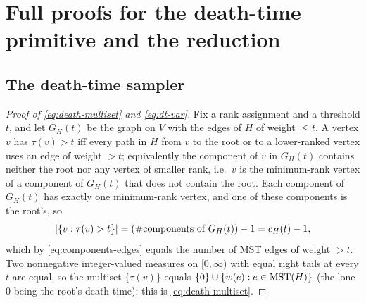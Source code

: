 \section{Full proofs for the death-time primitive and the reduction}\label{sec:app-assembly}

\subsection{The death-time sampler}\label{sec:app-dt}

\begin{proof}[Proof of \eqref{eq:death-multiset} and \eqref{eq:dt-var}]
Fix a rank assignment and a threshold $t$, and let $G_H(t)$ be the graph on $V$ with the edges of $H$ of
weight $\le t$. A vertex $v$ has $\tau(v)>t$ iff every path in $H$ from $v$ to the root or to a
lower-ranked vertex uses an edge of weight $>t$; equivalently the component of $v$ in $G_H(t)$ contains
neither the root nor any vertex of smaller rank, i.e.\ $v$ is the minimum-rank vertex of a component of
$G_H(t)$ that does not contain the root. Each component of $G_H(t)$ has exactly one minimum-rank vertex,
and one of these components is the root's, so
\[
  \left|\{v:\tau(v)>t\}\right|=(\#\text{components of }G_H(t))-1=c_H(t)-1,
\]
which by \eqref{eq:components-edges} equals the number of MST edges of weight $>t$. Two nonnegative
integer-valued measures on $[0,\infty)$ with equal right tails at every $t$ are equal, so the multiset
$\{\tau(v)\}$ equals $\{0\}\cup\{w(e):e\in\mathrm{MST}(H)\}$ (the lone $0$ being the root's death time); this is
\eqref{eq:death-multiset}.


\end{proof}
